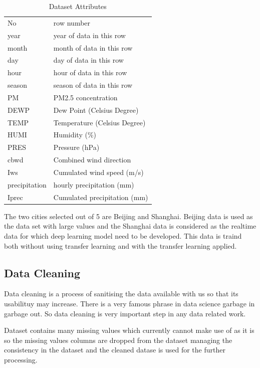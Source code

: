 \begin{table}[ht]
\centering
\begin{tabular}[widht=\textwidth]{|l|l|}
\hline

No & row number \\
year & year of data in this row \\
month & month of data in this row \\
day & day of data in this row \\
hour & hour of data in this row \\
season & season of data in this row \\
PM & PM2.5 concentration  \\
DEWP & Dew Point (Celsius Degree) \\
TEMP & Temperature (Celsius Degree) \\
HUMI & Humidity (\%) \\
PRES & Pressure (hPa) \\
cbwd & Combined wind direction \\
Iws & Cumulated wind speed (m/s) \\
precipitation & hourly precipitation (mm) \\
Iprec & Cumulated precipitation (mm) \\
\hline
\end{tabular}
\caption{Dataset Attributes}
\label{tab:dataset-attributes}
\end{table}

The two cities selected out of 5 are Beijing and Shanghai. Beijing data is used as the data set with large values and the Shanghai data is considered as the realtime data for which deep learning model need to be developed. This data is traind both without using transfer learning and with the transfer learning applied.

\subsection{Data Cleaning}

Data cleaning is a process of sanitising the data available with us so that its usabilituy may increase. There is a very famous phrase in data science garbage in garbage out. So data cleaning is very important step in any data related work.

Dataset contains many missing values which currently cannot make use of as it is so the missing values columns are dropped from the dataset managing the consistency in the dataset and the cleaned datase is used for the further processing.

